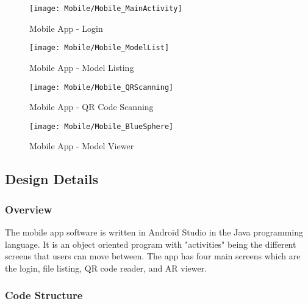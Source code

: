     \begin{figure}[H]
        \texttt{[image: Mobile/Mobile\_MainActivity]}
        \centering
        \caption{Mobile App - Login}
        \label{fig:mobileLoginActivity}
    \end{figure}

    \begin{figure}[H]
        \texttt{[image: Mobile/Mobile\_ModelList]}
        \centering
        \caption{Mobile App - Model Listing}
        \label{fig:mobileModelList}
    \end{figure}

    \begin{figure}[H]
        \texttt{[image: Mobile/Mobile\_QRScanning]}
        \centering
        \caption{Mobile App - QR Code Scanning}
        \label{fig:mobileQRScanning}
    \end{figure}

    \begin{figure}[H]
        \texttt{[image: Mobile/Mobile\_BlueSphere]}
        \centering
        \caption{Mobile App - Model Viewer}
        \label{fig:mobileModelViewer}
    \end{figure}

    \subsection{Design Details}

        \subsubsection{Overview}
The mobile app software is written in Android Studio in the Java programming language. It is an object oriented program with "activities" being the different screens that users can move between. The app has four main screens which are the login, file listing, QR code reader, and AR viewer.
        \subsubsection{Code Structure}


    